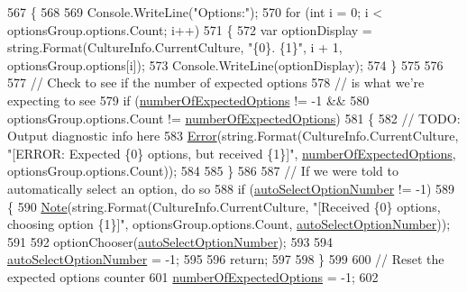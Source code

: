 \begin{DoxyCode}
567             \{
568 
569                 Console.WriteLine(\textcolor{stringliteral}{"Options:"});
570                 \textcolor{keywordflow}{for} (\textcolor{keywordtype}{int} i = 0; i < optionsGroup.options.Count; i++)
571                 \{
572                     var optionDisplay = string.Format(CultureInfo.CurrentCulture, \textcolor{stringliteral}{"\{0\}. \{1\}"}, i + 1, 
      optionsGroup.options[i]);
573                     Console.WriteLine(optionDisplay);
574                 \}
575 
576 
577                 \textcolor{comment}{// Check to see if the number of expected options}
578                 \textcolor{comment}{// is what we're expecting to see}
579                 \textcolor{keywordflow}{if} (\hyperlink{a00056_a2e17937195ecd64d5d867d958c45d2c3}{numberOfExpectedOptions} != -1 &&
580                     optionsGroup.options.Count != \hyperlink{a00056_a2e17937195ecd64d5d867d958c45d2c3}{numberOfExpectedOptions})
581                 \{
582                     \textcolor{comment}{// TODO: Output diagnostic info here}
583                     \hyperlink{a00195_a2f63f9f5b7634cb50ee75ff2eb18b137}{Error}(\textcolor{keywordtype}{string}.Format(CultureInfo.CurrentCulture, \textcolor{stringliteral}{"[ERROR: Expected \{0\} options, but
       received \{1\}]"}, \hyperlink{a00056_a2e17937195ecd64d5d867d958c45d2c3}{numberOfExpectedOptions}, optionsGroup.options.Count));
584 
585                 \}
586 
587                 \textcolor{comment}{// If we were told to automatically select an option, do so}
588                 \textcolor{keywordflow}{if} (\hyperlink{a00056_a34886671e91a1bf3fc225eeb67baced1}{autoSelectOptionNumber} != -1)
589                 \{
590                     \hyperlink{a00195_a939cc9e943c574b36c6af93e9c772702}{Note}(\textcolor{keywordtype}{string}.Format(CultureInfo.CurrentCulture, \textcolor{stringliteral}{"[Received \{0\} options, choosing
       option \{1\}]"}, optionsGroup.options.Count, \hyperlink{a00056_a34886671e91a1bf3fc225eeb67baced1}{autoSelectOptionNumber}));
591 
592                     optionChooser(\hyperlink{a00056_a34886671e91a1bf3fc225eeb67baced1}{autoSelectOptionNumber});
593 
594                     \hyperlink{a00056_a34886671e91a1bf3fc225eeb67baced1}{autoSelectOptionNumber} = -1;
595 
596                     \textcolor{keywordflow}{return};
597 
598                 \}
599 
600                 \textcolor{comment}{// Reset the expected options counter}
601                 \hyperlink{a00056_a2e17937195ecd64d5d867d958c45d2c3}{numberOfExpectedOptions} = -1;
602 

\end{DoxyCode}
